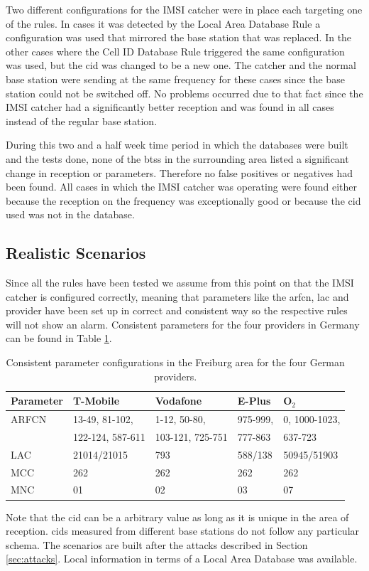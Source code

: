 Two different configurations for the IMSI catcher were in place each targeting one of the rules.
In cases it was detected by the Local Area Database Rule a configuration was used that mirrored the base station that was replaced.
In the other cases where the Cell ID Database Rule triggered the same configuration was used, but the \gls{cid} was changed to be a new one.
The catcher and the normal base station were sending at the same frequency for these cases since the base station could not be switched off.
No problems occurred due to that fact since the IMSI catcher had a significantly better reception and was found in all cases instead of the regular base station.

During this two and a half week time period in which the databases were built and the tests done, none of the \glspl{bts} in the surrounding area listed a significant change in reception or parameters.
Therefore no false positives or negatives had been found.
All cases in which the IMSI catcher was operating were found either because the reception on the frequency was exceptionally good or because the \gls{cid} used was not in the database.

\subsection{Realistic Scenarios}
Since all the rules have been tested we assume from this point on that the IMSI catcher is configured correctly, meaning that parameters like the \gls{arfcn}, \gls{lac} and provider have been set up in correct and consistent way so the respective rules will not show an alarm.
Consistent parameters for the four providers in Germany can be found in Table \ref{tab:consistent_parameters}.
\begin{table}
\centering
\begin{tabular}{lllll}
\toprule
Parameter	&T-Mobile				&Vodafone			&E-Plus			&O$_2$\\
\midrule
ARFCN		&13-49, 81-102,			&1-12, 50-80,		&975-999,		&0, 1000-1023,\\
			&122-124, 587-611		&103-121, 725-751	&777-863		&637-723\\
LAC			&21014/21015			&793				&588/138		&50945/51903\\
MCC			&262					&262				&262			&262\\
MNC			&01						&02					&03				&07\\
\bottomrule
\end{tabular}
\caption{Consistent parameter configurations in the Freiburg area for the four German providers.}
\label{tab:consistent_parameters}
\end{table}
Note that the \gls{cid} can be a arbitrary value as long as it is unique in the area of reception. 
\glspl{cid} measured from different base stations do not follow any particular schema.
The scenarios are built after the attacks described in Section \ref{sec:attacks}.
Local information in terms of a Local Area Database was available.

